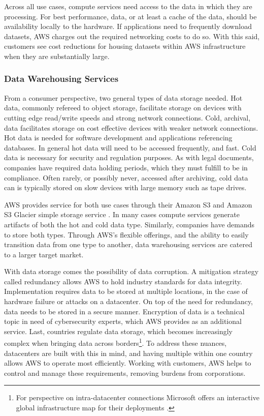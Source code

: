 \documentclass[a4paper, 12pt]{article}
\begin{document}
Across all use cases, compute services need access to the data in which they are processing. 
For best performance, data, or at least a cache of the data, should be availability locally to the hardware.
If applications need to frequently download datasets, AWS charges out the required networking costs to do so. 
With this said, customers see cost reductions for housing datasets within AWS infrastructure when they are substantially large. 

\subsubsection{Data Warehousing Services}
From a consumer perspective, two general types of data storage needed. 
Hot data, commonly refereed to object storage, facilitate storage on devices with cutting edge read/write speeds and strong network connections. 
Cold, archival, data facilitates storage on cost effective devices with weaker network connections. 
Hot data is needed for software development and applications referencing databases. 
In general hot data will need to be accessed frequently, and fast. 
Cold data is necessary for security and regulation purposes. 
As with legal documents, companies have required data holding periods, which they must fulfill to be in compliance. 
Often rarely, or possibly never, accessed after archiving, cold data can is typically stored on slow devices with large memory such as tape drives. 

AWS provides service for both use cases through their Amazon S3 and Amazon S3 Glacier simple storage service \cite{AMZN_AWS_SIMPLE_STORAGE}. 
In many cases compute services generate artifacts of both the hot and cold data type. 
Similarly, companies have demands to store both types. 
Through AWS's flexible offerings, and the ability to easily transition data from one type to another, data warehousing services are catered to a larger target market. 

With data storage comes the possibility of data corruption. 
A mitigation strategy called redundancy allows AWS to hold industry standards for data integrity. 
Implementation requires data to be stored at multiple locations, in the case of hardware failure or attacks on a datacenter. 
On top of the need for redundancy, data needs to be stored in a secure manner. 
Encryption of data is a technical topic in need of cybersecurity experts, which AWS provides as an additional service. 
Last, countries regulate data storage, which becomes increasingly complex when bringing data across borders\footnote{For perspective on intra-datacenter connections Microsoft offers an interactive global infrastructure map for their deployments \cite{MSFT_AZURE_GLOBAL_INFRA_MAP}.}. 
To address these nuances, datacenters are built with this in mind, and having multiple within one country allows AWS to operate most efficiently. 
Working with customers, AWS helps to control and manage these requirements, removing burdens from corporations. 
\end{document}
